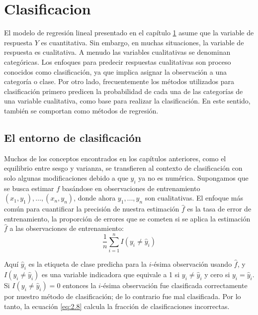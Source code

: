 \chapter{Clasificacion}\label{Chapter3} 


El modelo de regresión lineal presentado en el capítulo \ref{Chapter3} asume que la variable de respuesta $Y$ es cuantitativa. Sin embargo, en muchas situaciones, la variable de respuesta es cualitativa. A menudo las variables cualitativas se denominan categóricas. Los enfoques para predecir respuestas cualitativas son proceso conocidos como clasificación, ya que implica asignar la observación a una categoría o clase. Por otro lado, frecuentemente los métodos utilizados para clasificación primero predicen la probabilidad de cada una de las categorías de una variable cualitativa, como base para realizar la clasificación. En este sentido, también se comportan como métodos de regresión.

\section{El entorno de clasificación}

Muchos de los conceptos encontrados en los capítulos anteriores, como el equilibrio entre sesgo y varianza, se transfieren al contexto de clasificación con solo algunas modificaciones debido a que $y_i$ ya no es numérica. Supongamos que se busca estimar $f$ basándose en observaciones de entrenamiento ${(x_1,y_1), \dots,(x_n,y_n)}$, donde ahora $y_1,...,y_n$ son cualitativas. El enfoque más común para cuantificar la precisión de nuestra estimación $\hat{f}$ es la tasa de error de entrenamiento, la proporción de errores que se cometen si se aplica la estimación $\hat{f}$ a las observaciones de entrenamiento:
\begin{equation}
\frac{1}{n}\sum_{i=1}^n I(y_i \neq \hat{y}_i)
\label{eq:2.8}
\end{equation}

Aquí $\hat{y}_i$ es la etiqueta de clase predicha para la $i$-ésima observación usando $\hat{f}$, y $I(y_i \neq \hat{y}_i)$ es una variable indicadora que equivale a 1 si $y_i \neq \hat{y}_i$ y cero si $y_i = \hat{y}_i$. Si $I(y_i \neq \hat{y}_i) = 0$ entonces la $i$-ésima observación fue clasificada correctamente por nuestro método de clasificación; de lo contrario fue mal clasificada. Por lo tanto, la ecuación \ref{eq:2.8} calcula la fracción de clasificaciones incorrectas. \\

